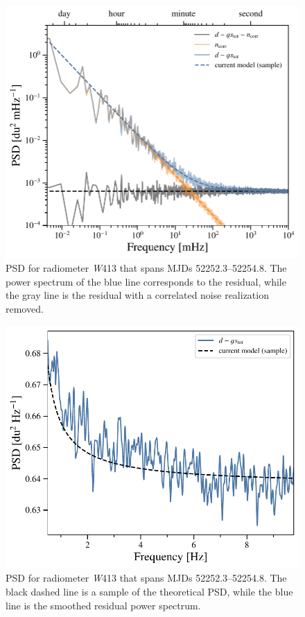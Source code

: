 \documentclass[twocolumn]{../../common/aa}
\newcommand{\W}[0]{\textit W}
\begin{document}
\begin{figure}
	\includegraphics[width=\columnwidth]{figures/ps_test_W4_det1.pdf}
	\caption{PSD for radiometer \W413 that spans MJDs 52252.3--52254.8. The power spectrum of the blue line corresponds to the residual, while the gray line is the residual with a correlated noise realization removed.}
	\label{fig:W413_psd}
\end{figure}

\begin{figure}
	\includegraphics[width=\columnwidth]{figures/ps_test_W4_det1_zoom.pdf}
	\caption{PSD for radiometer \W413 that spans MJDs 52252.3--52254.8. 
	The black dashed line is a sample of the theoretical PSD, while the blue line is the smoothed residual power spectrum.
	}
	\label{fig:W413_psd_zoom}
\end{figure}
\end{document}
